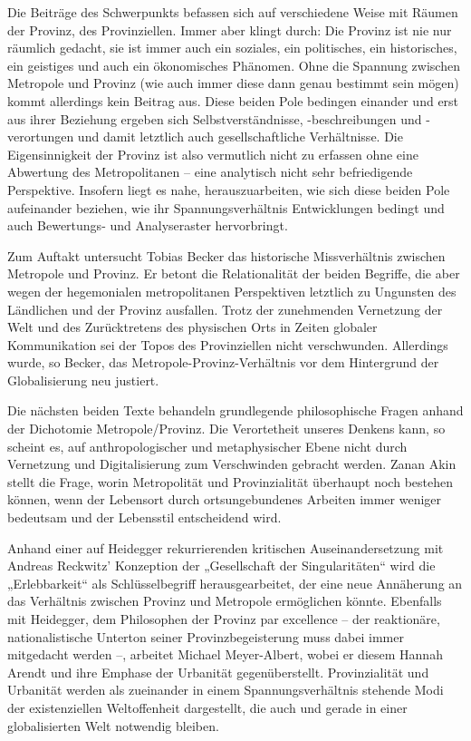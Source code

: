 \begin{multicols*}{2}
Die Beiträge des Schwerpunkts befassen sich auf verschiedene Weise mit Räumen der Provinz, des Provinziellen. Immer aber klingt durch: Die Provinz ist nie nur räumlich gedacht, sie ist immer auch ein soziales, ein politisches, ein historisches, ein geistiges und auch ein ökonomisches Phänomen. Ohne die Spannung zwischen Metropole und Provinz (wie auch immer diese dann genau bestimmt sein mögen) kommt allerdings kein Beitrag aus. Diese beiden Pole bedingen einander und erst aus ihrer Beziehung ergeben sich Selbstverständnisse, -beschreibungen und -verortungen und damit letztlich auch gesellschaftliche Verhältnisse. Die Eigensinnigkeit der Provinz ist also vermutlich nicht zu erfassen ohne eine Abwertung des Metropolitanen – eine analytisch nicht sehr befriedigende Perspektive. Insofern liegt es nahe, herauszuarbeiten, wie sich diese beiden Pole aufeinander beziehen, wie ihr Spannungsverhältnis Entwicklungen bedingt und auch Bewertungs- und Analyseraster hervorbringt.

Zum Auftakt untersucht Tobias Becker das historische Missverhältnis zwischen Metropole und Provinz. Er betont die Relationalität der beiden Begriffe, die aber wegen der hegemonialen metropolitanen Perspektiven letztlich zu Ungunsten des Ländlichen und der Provinz ausfallen. Trotz der zunehmenden Vernetzung der Welt und des Zurücktretens des physischen Orts in Zeiten globaler Kommunikation sei der Topos des Provinziellen nicht verschwunden. Allerdings wurde, so Becker, das Metropole-Provinz-Verhältnis vor dem Hintergrund der Globalisierung neu justiert.

Die nächsten beiden Texte behandeln grundlegende philosophische Fragen anhand der Dichotomie Metropole/Provinz. Die Verortetheit unseres Denkens kann, so scheint es, auf anthropologischer und metaphysischer Ebene nicht durch Vernetzung und Digitalisierung zum Verschwinden gebracht werden. Zanan Akin stellt die Frage, worin Metropolität und Provinzialität überhaupt noch bestehen können, wenn der Lebensort durch ortsungebundenes Arbeiten immer weniger bedeutsam und der Lebensstil entscheidend wird. 

Anhand einer auf Heidegger rekurrierenden kritischen Auseinandersetzung mit Andreas Reckwitz’ Konzeption der „Gesellschaft der Singularitäten“ wird die „Erlebbarkeit“ als Schlüsselbegriff herausgearbeitet, der eine neue Annäherung an das Verhältnis zwischen Provinz und Metropole ermöglichen könnte. Ebenfalls mit Heidegger, dem Philosophen der Provinz par excellence – der reaktionäre, nationalistische Unterton seiner Provinzbegeisterung muss dabei immer mitgedacht werden –, arbeitet Michael Meyer-Albert, wobei er diesem Hannah Arendt und ihre Emphase der Urbanität gegenüberstellt. Provinzialität und Urbanität werden als zueinander in einem Spannungsverhältnis stehende Modi der existenziellen Weltoffenheit dargestellt, die auch und gerade in einer globalisierten Welt notwendig bleiben.


\end{multicols*}
